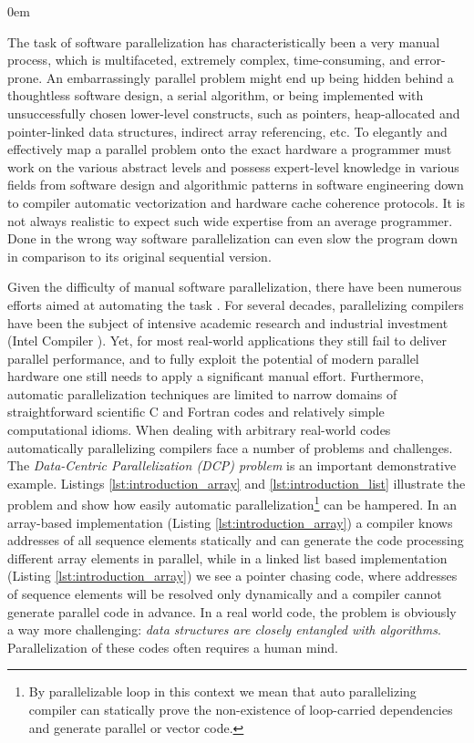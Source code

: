 \begin{description}[style=unboxed,leftmargin=0cm]
\itemsep0em
\item[\textit{Manual parallelization challenges}] The task of software parallelization has characteristically been a very manual process, which is multifaceted, extremely complex, time-consuming, and error-prone. An embarrassingly parallel problem might end up being hidden behind a thoughtless software design, a serial algorithm, or being implemented with unsuccessfully chosen lower-level constructs, such as pointers, heap-allocated and pointer-linked data structures, indirect array referencing, etc. To elegantly and effectively map a parallel problem onto the exact hardware a programmer must work on the various abstract levels and possess expert-level knowledge in various fields from software design and algorithmic patterns in software engineering down to compiler automatic vectorization and hardware cache coherence protocols. It is not always realistic to expect such wide expertise from an average programmer. Done in the wrong way software parallelization can even slow the program down in comparison to its original sequential version.
\item[\textit{Automatic parallelization limitations}] Given the difficulty of manual software parallelization, there have been numerous efforts aimed at automating the task \cite{Bacon:1994:CTH:197405.197406}. For several decades, parallelizing compilers have been the subject of intensive academic research \cite{6813266} and industrial investment (Intel Compiler \cite{icc-compiler}). Yet, for most real-world applications they still fail to deliver parallel performance, and to fully exploit the potential of modern parallel hardware one still needs to apply a significant manual effort. Furthermore, automatic parallelization techniques are limited to narrow domains of straightforward scientific C and Fortran codes and relatively simple computational idioms. When dealing with arbitrary real-world codes automatically parallelizing compilers face a number of problems and challenges. The \textit{Data-Centric Parallelization (DCP) problem} is an important demonstrative example. Listings \ref{lst:introduction_array} and \ref{lst:introduction_list} illustrate the problem and show how easily automatic parallelization\footnote{By parallelizable loop in this context we mean that auto parallelizing compiler can statically prove the non-existence of loop-carried dependencies and generate parallel or vector code.} can be hampered. In an array-based implementation (Listing \ref{lst:introduction_array}) a compiler knows addresses of all sequence elements statically and can generate the code processing different array elements in parallel, while in a linked list based implementation (Listing \ref{lst:introduction_array}) we see a pointer chasing code, where addresses of sequence elements will be resolved only dynamically and a compiler cannot generate parallel code in advance. In a real world code, the problem is obviously a way more challenging: \textit{data structures are closely entangled with algorithms}. Parallelization of these codes often requires a human mind.\newline\null

\end{description}
